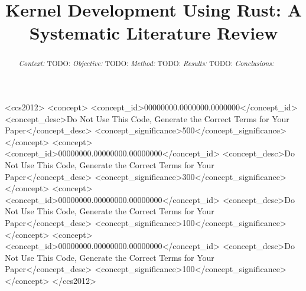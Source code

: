 \documentclass[sigconf]{acmart}
\begin{document}
\title{Kernel Development Using Rust: A Systematic Literature Review}



\renewcommand{\shortauthors}{Panter et al.}

\begin{abstract}
    \textit{Context:}
    TODO:
    \textit{Objective:}
    TODO:
    \textit{Method:}
    TODO:
    \textit{Results:}
    TODO:
    \textit{Conclusions:}
\end{abstract}

\begin{CCSXML}
<ccs2012>
 <concept>
  <concept_id>00000000.0000000.0000000</concept_id>
  <concept_desc>Do Not Use This Code, Generate the Correct Terms for Your Paper</concept_desc>
  <concept_significance>500</concept_significance>
 </concept>
 <concept>
  <concept_id>00000000.00000000.00000000</concept_id>
  <concept_desc>Do Not Use This Code, Generate the Correct Terms for Your Paper</concept_desc>
  <concept_significance>300</concept_significance>
 </concept>
 <concept>
  <concept_id>00000000.00000000.00000000</concept_id>
  <concept_desc>Do Not Use This Code, Generate the Correct Terms for Your Paper</concept_desc>
  <concept_significance>100</concept_significance>
 </concept>
 <concept>
  <concept_id>00000000.00000000.00000000</concept_id>
  <concept_desc>Do Not Use This Code, Generate the Correct Terms for Your Paper</concept_desc>
  <concept_significance>100</concept_significance>
 </concept>
</ccs2012>
\end{CCSXML}


\end{document}
